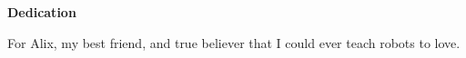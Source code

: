 
\begin{center}

\vspace*{5\baselineskip}
\textbf{\large Dedication}
\end{center}

\begin{center}
For Alix, my best friend, and true believer that I could ever teach robots
to love.
\end{center}

